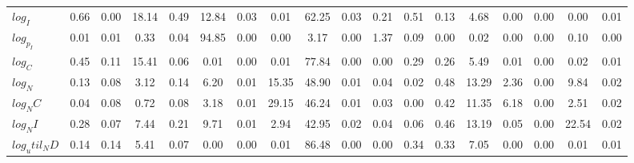 \begin{center}
\begin{longtable}{lccccccccccccccccc}
$log_I        $	 & 	            0.66	 & 	            0.00	 & 	           18.14	 & 	            0.49	 & 	           12.84	 & 	            0.03	 & 	            0.01	 & 	           62.25	 & 	            0.03	 & 	            0.21	 & 	            0.51	 & 	            0.13	 & 	            4.68	 & 	            0.00	 & 	            0.00	 & 	            0.00	 & 	            0.01 \\ 
$log_p_I      $	 & 	            0.01	 & 	            0.01	 & 	            0.33	 & 	            0.04	 & 	           94.85	 & 	            0.00	 & 	            0.00	 & 	            3.17	 & 	            0.00	 & 	            1.37	 & 	            0.09	 & 	            0.00	 & 	            0.02	 & 	            0.00	 & 	            0.00	 & 	            0.10	 & 	            0.00 \\ 
$log_C        $	 & 	            0.45	 & 	            0.11	 & 	           15.41	 & 	            0.06	 & 	            0.01	 & 	            0.00	 & 	            0.01	 & 	           77.84	 & 	            0.00	 & 	            0.00	 & 	            0.29	 & 	            0.26	 & 	            5.49	 & 	            0.01	 & 	            0.00	 & 	            0.02	 & 	            0.01 \\ 
$log_N        $	 & 	            0.13	 & 	            0.08	 & 	            3.12	 & 	            0.14	 & 	            6.20	 & 	            0.01	 & 	           15.35	 & 	           48.90	 & 	            0.01	 & 	            0.04	 & 	            0.02	 & 	            0.48	 & 	           13.29	 & 	            2.36	 & 	            0.00	 & 	            9.84	 & 	            0.02 \\ 
$log_NC       $	 & 	            0.04	 & 	            0.08	 & 	            0.72	 & 	            0.08	 & 	            3.18	 & 	            0.01	 & 	           29.15	 & 	           46.24	 & 	            0.01	 & 	            0.03	 & 	            0.00	 & 	            0.42	 & 	           11.35	 & 	            6.18	 & 	            0.00	 & 	            2.51	 & 	            0.02 \\ 
$log_NI       $	 & 	            0.28	 & 	            0.07	 & 	            7.44	 & 	            0.21	 & 	            9.71	 & 	            0.01	 & 	            2.94	 & 	           42.95	 & 	            0.02	 & 	            0.04	 & 	            0.06	 & 	            0.46	 & 	           13.19	 & 	            0.05	 & 	            0.00	 & 	           22.54	 & 	            0.02 \\ 
$log_util_ND  $	 & 	            0.14	 & 	            0.14	 & 	            5.41	 & 	            0.07	 & 	            0.00	 & 	            0.00	 & 	            0.01	 & 	           86.48	 & 	            0.00	 & 	            0.00	 & 	            0.34	 & 	            0.33	 & 	            7.05	 & 	            0.00	 & 	            0.00	 & 	            0.01	 & 	            0.01 \\ 

\end{longtable}
\end{center}
